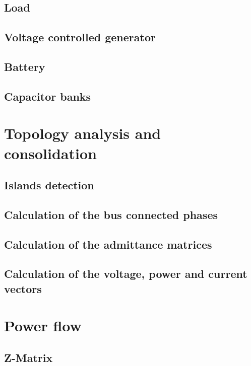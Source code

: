 \documentclass{tufte-book}
\begin{document}
\section{Load}


\section{Voltage controlled generator}


\section{Battery}


\section{Capacitor banks}

\chapter{Topology analysis and consolidation}


\section{Islands detection}


\section{Calculation of the bus connected phases}


\section{Calculation of the admittance matrices}


\section{Calculation of the voltage, power and current vectors}


\chapter{Power flow}


\section{Z-Matrix}
\end{document}
